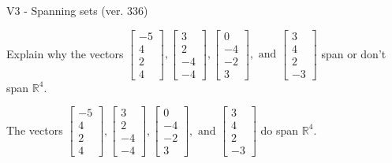 \begin{exercise}
  \begin{exerciseTitle}V3 - Spanning sets (ver. 336)\end{exerciseTitle}
  \begin{exerciseStatement}
    Explain why the vectors \(\left[\begin{array}{r}
-5 \\
4 \\
2 \\
4
\end{array}\right] , \left[\begin{array}{r}
3 \\
2 \\
-4 \\
-4
\end{array}\right] , \left[\begin{array}{r}
0 \\
-4 \\
-2 \\
3
\end{array}\right] , \text{ and } \left[\begin{array}{r}
3 \\
4 \\
2 \\
-3
\end{array}\right]\) span or don't span \(\mathbb{R}^4\). 
	


  \end{exerciseStatement}
  \begin{exerciseAnswer}
   The vectors \(\left[\begin{array}{r}
-5 \\
4 \\
2 \\
4
\end{array}\right] , \left[\begin{array}{r}
3 \\
2 \\
-4 \\
-4
\end{array}\right] , \left[\begin{array}{r}
0 \\
-4 \\
-2 \\
3
\end{array}\right] , \text{ and } \left[\begin{array}{r}
3 \\
4 \\
2 \\
-3
\end{array}\right]\) 
  	 do  
	span \(\mathbb{R}^4\).
  


  \end{exerciseAnswer}
\end{exercise}